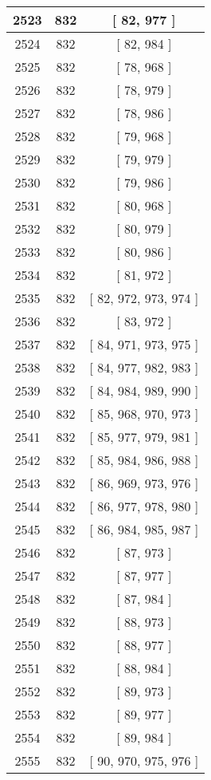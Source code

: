 \begin{center}
\begin{longtable}[H]{|| c c c ||}
\hline
2523 & 832 & [ 82, 977 ] \\ 
\hline
2524 & 832 & [ 82, 984 ] \\ 
\hline
2525 & 832 & [ 78, 968 ] \\ 
\hline
2526 & 832 & [ 78, 979 ] \\ 
\hline
2527 & 832 & [ 78, 986 ] \\ 
\hline
2528 & 832 & [ 79, 968 ] \\ 
\hline
2529 & 832 & [ 79, 979 ] \\ 
\hline
2530 & 832 & [ 79, 986 ] \\ 
\hline
2531 & 832 & [ 80, 968 ] \\ 
\hline
2532 & 832 & [ 80, 979 ] \\ 
\hline
2533 & 832 & [ 80, 986 ] \\ 
\hline
2534 & 832 & [ 81, 972 ] \\ 
\hline
2535 & 832 & [ 82, 972, 973, 974 ] \\ 
\hline
2536 & 832 & [ 83, 972 ] \\ 
\hline
2537 & 832 & [ 84, 971, 973, 975 ] \\ 
\hline
2538 & 832 & [ 84, 977, 982, 983 ] \\ 
\hline
2539 & 832 & [ 84, 984, 989, 990 ] \\ 
\hline
2540 & 832 & [ 85, 968, 970, 973 ] \\ 
\hline
2541 & 832 & [ 85, 977, 979, 981 ] \\ 
\hline
2542 & 832 & [ 85, 984, 986, 988 ] \\ 
\hline
2543 & 832 & [ 86, 969, 973, 976 ] \\ 
\hline
2544 & 832 & [ 86, 977, 978, 980 ] \\ 
\hline
2545 & 832 & [ 86, 984, 985, 987 ] \\ 
\hline
2546 & 832 & [ 87, 973 ] \\ 
\hline
2547 & 832 & [ 87, 977 ] \\ 
\hline
2548 & 832 & [ 87, 984 ] \\ 
\hline
2549 & 832 & [ 88, 973 ] \\ 
\hline
2550 & 832 & [ 88, 977 ] \\ 
\hline
2551 & 832 & [ 88, 984 ] \\ 
\hline
2552 & 832 & [ 89, 973 ] \\ 
\hline
2553 & 832 & [ 89, 977 ] \\ 
\hline
2554 & 832 & [ 89, 984 ] \\ 
\hline
2555 & 832 & [ 90, 970, 975, 976 ] \\ 

\end{longtable}
\end{center}
